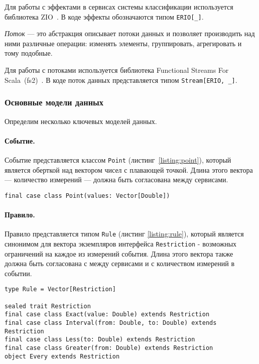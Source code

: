 \documentclass[14pt]{article}
\begin{document}
Для работы с эффектами в сервисах системы классификации используется библиотека ZIO~\cite{zio}. В коде эффекты обозначаются типом \verb|ERIO[_]|.

\emph{Поток} --- это абстракция описывает потоки данных и позволяет производить над ними различные операции: изменять элементы, группировать, агрегировать и тому подобные.

Для работы с потоками используется библиотека Functional Streams For Scala~(fs2)~\cite{fs2}. В коде поток данных представляется типом \verb|Stream[ERIO, _]|.

\subsubsection{Основные модели данных}
Определим несколько ключевых моделей данных.
\paragraph{Событие.} Событие представляется классом \verb|Point| (листинг~\ref{listing:point}), который является оберткой над вектором чисел с плавающей точкой. Длина этого вектора --- количество измерений --- должна быть согласована между сервисами.

\begin{lstlisting}[style=scalaStyle,caption={Класс, описывающий событие.},label={listing:point},captionpos=b, float]
final case class Point(values: Vector[Double])
\end{lstlisting}

\paragraph{Правило.}
Правило представляется типом \verb|Rule| (листинг \ref{listing:rule}), который является синонимом для вектора экземпляров интерфейса \verb|Restriction| - возможных ограничений на каждое из измерений события. Длина этого вектора также должна быть согласована с между сервисами и с количеством измерений в событии.

\begin{lstlisting}[style=scalaStyle,caption={Тип, описывающий правило.},label={listing:rule},captionpos=b, float]
type Rule = Vector[Restriction]

sealed trait Restriction
final case class Exact(value: Double) extends Restriction
final case class Interval(from: Double, to: Double) extends Restriction
final case class Less(to: Double) extends Restriction
final case class Greater(from: Double) extends Restriction
object Every extends Restriction
\end{lstlisting}
\end{document}
